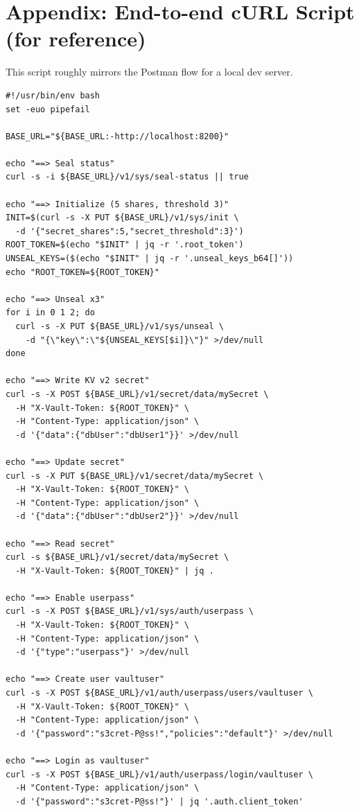 \documentclass[11pt]{article}
\begin{document}
\section{Appendix: End-to-end cURL Script (for reference)}
This script roughly mirrors the Postman flow for a local dev server.
\begin{verbatim}
#!/usr/bin/env bash
set -euo pipefail

BASE_URL="${BASE_URL:-http://localhost:8200}"

echo "==> Seal status"
curl -s -i ${BASE_URL}/v1/sys/seal-status || true

echo "==> Initialize (5 shares, threshold 3)"
INIT=$(curl -s -X PUT ${BASE_URL}/v1/sys/init \
  -d '{"secret_shares":5,"secret_threshold":3}')
ROOT_TOKEN=$(echo "$INIT" | jq -r '.root_token')
UNSEAL_KEYS=($(echo "$INIT" | jq -r '.unseal_keys_b64[]'))
echo "ROOT_TOKEN=${ROOT_TOKEN}"

echo "==> Unseal x3"
for i in 0 1 2; do
  curl -s -X PUT ${BASE_URL}/v1/sys/unseal \
    -d "{\"key\":\"${UNSEAL_KEYS[$i]}\"}" >/dev/null
done

echo "==> Write KV v2 secret"
curl -s -X POST ${BASE_URL}/v1/secret/data/mySecret \
  -H "X-Vault-Token: ${ROOT_TOKEN}" \
  -H "Content-Type: application/json" \
  -d '{"data":{"dbUser":"dbUser1"}}' >/dev/null

echo "==> Update secret"
curl -s -X PUT ${BASE_URL}/v1/secret/data/mySecret \
  -H "X-Vault-Token: ${ROOT_TOKEN}" \
  -H "Content-Type: application/json" \
  -d '{"data":{"dbUser":"dbUser2"}}' >/dev/null

echo "==> Read secret"
curl -s ${BASE_URL}/v1/secret/data/mySecret \
  -H "X-Vault-Token: ${ROOT_TOKEN}" | jq .

echo "==> Enable userpass"
curl -s -X POST ${BASE_URL}/v1/sys/auth/userpass \
  -H "X-Vault-Token: ${ROOT_TOKEN}" \
  -H "Content-Type: application/json" \
  -d '{"type":"userpass"}' >/dev/null

echo "==> Create user vaultuser"
curl -s -X POST ${BASE_URL}/v1/auth/userpass/users/vaultuser \
  -H "X-Vault-Token: ${ROOT_TOKEN}" \
  -H "Content-Type: application/json" \
  -d '{"password":"s3cret-P@ss!","policies":"default"}' >/dev/null

echo "==> Login as vaultuser"
curl -s -X POST ${BASE_URL}/v1/auth/userpass/login/vaultuser \
  -H "Content-Type: application/json" \
  -d '{"password":"s3cret-P@ss!"}' | jq '.auth.client_token'
\end{verbatim}
\end{document}
